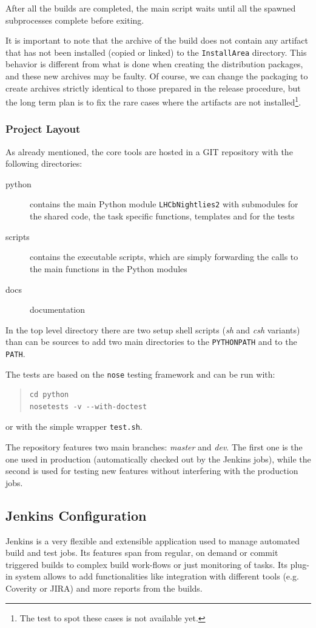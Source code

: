 \documentclass{lhcbnote}
\begin{document}
After all the builds are completed, the main script waits until all the spawned
subprocesses complete before exiting.

It is important to note that the archive of the build does not contain any
artifact that has not been installed (copied or linked) to the
\texttt{InstallArea} directory.  This behavior is different from what is done
when creating the distribution packages, and these new archives may be faulty.
Of course, we can change the packaging to create archives strictly identical to
those prepared in the release procedure, but the long term plan is to fix the
rare cases where the artifacts are not installed\footnote{The test to spot these
cases is not available yet.}.

\subsubsection{Project Layout}
As already mentioned, the core tools are hosted in a GIT repository with the
following directories:
\begin{description}
  \item[python] contains the main Python module \texttt{LHCbNightlies2} with
submodules for the shared code, the task specific functions, templates and for
the tests
  \item[scripts] contains the executable scripts, which are simply forwarding
the calls to the main functions in the Python modules
  \item[docs] documentation
\end{description}
In the top level directory there are two setup shell scripts (\emph{sh} and
\emph{csh} variants) than can be sources to add two main directories to the
\texttt{PYTHONPATH} and to the \texttt{PATH}.

The tests are based on the \texttt{nose} testing framework\cite{nose} and can be
run with:
\begin{quote}
\begin{verbatim}
cd python
nosetests -v --with-doctest
\end{verbatim}
\end{quote}
or with the simple wrapper \texttt{test.sh}.

The repository features two main branches: \emph{master} and \emph{dev}.  The
first one is the one used in production (automatically checked out by the
Jenkins jobs), while the second is used for testing new features without
interfering with the production jobs.

\subsection{Jenkins Configuration}
\label{Jenkins}
Jenkins is a very flexible and extensible application used to manage automated
build and test jobs.  Its features span from regular, on demand or commit
triggered builds to complex build work-flows or just monitoring of tasks.  Its
plug-in system allows to add functionalities like integration with different
tools (e.g. Coverity or JIRA) and more reports from the builds.
\end{document}
